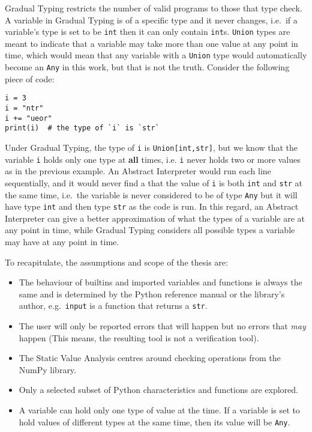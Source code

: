 Gradual Typing restricts the number of valid programs to those that type
check. A variable in Gradual Typing is of a specific type and it never
changes, i.e.~if a variable's type is set to be \texttt{int} then it can
only contain \texttt{int}s. \texttt{Union} types are meant to indicate
that a variable may take more than one value at any point in time, which
would mean that any variable with a \texttt{Union} type would
automatically become an \texttt{Any} in this work, but that is not the
truth. Consider the following piece of code:

\begin{verbatim}
i = 3
i = "ntr"
i += "ueor"
print(i)  # the type of `i` is `str`
\end{verbatim}

Under Gradual Typing, the type of \texttt{i} is
\texttt{Union{[}int,str{]}}, but we know that the variable \texttt{i}
holds only one type at \textbf{all} times, i.e. \texttt{i} never holds
two or more values as in the previous example. An Abstract Interpreter
would run each line sequentially, and it would never find a that the
value of \texttt{i} is both \texttt{int} and \texttt{str} at the same
time, i.e.~the variable is never considered to be of type \texttt{Any}
but it will have type \texttt{int} and then type \texttt{str} as the
code is run. In this regard, an Abstract Interpreter can give a better
approximation of what the types of a variable are at any point in time,
while Gradual Typing considers all possible types a variable may have at
any point in time.

To recapitulate, the assumptions and scope of the thesis are:

\begin{itemize}
\tightlist
\item
  The behaviour of builtins and imported variables and functions is
  always the same and is determined by the Python reference manual or
  the library's author, e.g.~\texttt{input} is a function that returns
  a \texttt{str}.
\item
  The user will only be reported errors that will happen but no errors
  that \emph{may} happen (This means, the resulting tool is not a
  verification tool).
\item
  The Static Value Analysis centres around checking operations from the
  NumPy library.
\item
  Only a selected subset of Python characteristics and functions are
  explored.
\item
  A variable can hold only one type of value at the time. If a variable
  is set to hold values of different types at the same time, then its
  value will be \texttt{Any}.
\end{itemize}

